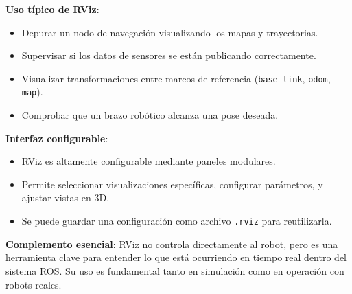 \textbf{Uso típico de RViz}:
\begin{itemize}
	\item Depurar un nodo de navegación visualizando los mapas y trayectorias.
	\item Supervisar si los datos de sensores se están publicando correctamente.
	\item Visualizar transformaciones entre marcos de referencia (\texttt{base\_link}, \texttt{odom}, \texttt{map}).
	\item Comprobar que un brazo robótico alcanza una pose deseada.
\end{itemize}

\textbf{Interfaz configurable}:
\begin{itemize}
	\item RViz es altamente configurable mediante paneles modulares.
	\item Permite seleccionar visualizaciones específicas, configurar parámetros, y ajustar vistas en 3D.
	\item Se puede guardar una configuración como archivo \texttt{.rviz} para reutilizarla.
\end{itemize}

\textbf{Complemento esencial}:
RViz no controla directamente al robot, pero es una herramienta clave para entender lo que está ocurriendo en tiempo real dentro del sistema ROS. Su uso es fundamental tanto en simulación como en operación con robots reales.
